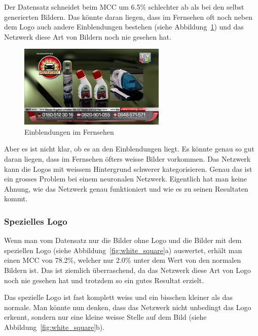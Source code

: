 \documentclass[12pt,a4paper]{report}
\begin{document}
Der Datensatz schneidet beim MCC um 6.5\% schlechter ab als bei den selbst generierten Bildern.
Das könnte daran liegen, dass im Fernsehen oft noch neben dem Logo auch andere Einblendungen bestehen (siehe Abbildung~\ref{fig:einblenden})
und das Netzwerk diese Art von Bildern noch nie gesehen hat.
\begin{figure}[h]%
    \centering
    \includegraphics[width=7cm]{assets/images/tv_einblenden.jpg}%
    \caption{Einblendungen im Fernsehen}%
    \label{fig:einblenden}%
\end{figure}
Aber es ist nicht klar, ob es an den Einblendungen liegt.
Es könnte genau so gut daran liegen,
dass im Fernsehen öfters weisse Bilder vorkommen.
Das Netzwerk kann die Logos mit weissem Hintergrund schwerer kategorisieren.
Genau das ist ein grosses Problem bei einem neuronalen Netzwerk.
Eigentlich hat man keine Ahnung, wie das Netzwerk genau funktioniert und wie es zu seinen Resultaten kommt.
\subsubsection{Spezielles Logo}
Wenn man vom Datensatz nur die Bilder ohne Logo und die Bilder mit dem speziellen Logo (siehe Abbildung~\ref{fig:white_square}a) auswertet,
erhält man einen MCC von 78.2\%, welcher nur 2.0\% unter dem Wert von den normalen Bildern ist.
Das ist ziemlich überraschend, da das Netzwerk diese Art von Logo noch nie gesehen hat und trotzdem so ein gutes Resultat erzielt.

Das spezielle Logo ist fast komplett weiss und ein bisschen kleiner als das normale.
Man könnte nun denken, dass das Netzwerk nicht unbedingt das Logo erkennt,
sondern nur eine kleine weisse Stelle auf dem Bild (siehe Abbildung~\ref{fig:white_square}b).
\end{document}
